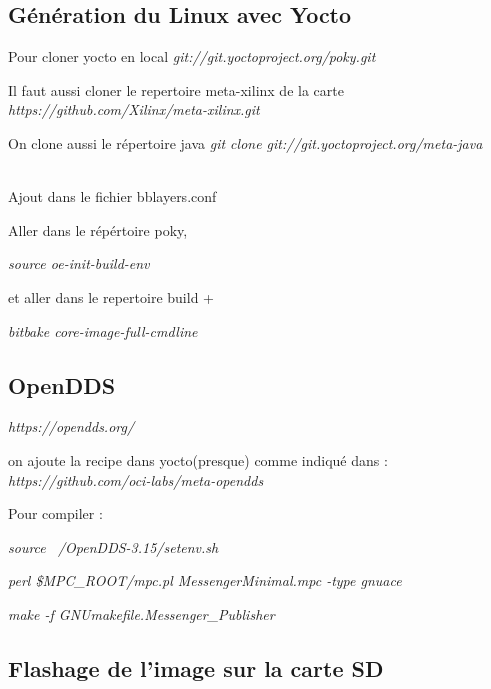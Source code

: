 \subsection{Génération du Linux avec Yocto}
Pour cloner yocto en local
\textit{git://git.yoctoproject.org/poky.git}

Il faut aussi cloner le repertoire meta-xilinx de la carte 
\textit{https://github.com/Xilinx/meta-xilinx.git}

On clone aussi le répertoire java
\textit{git clone git://git.yoctoproject.org/meta-java}

\\

Ajout dans le fichier bblayers.conf
\\



Aller dans le répértoire poky, 

\textit{ source oe-init-build-env}

et aller dans le repertoire build +

\textit{ bitbake core-image-full-cmdline} 
\subsection{OpenDDS}

\textit{https://opendds.org/}

on ajoute la recipe dans yocto(presque) comme indiqué dans :
\textit{https://github.com/oci-labs/meta-opendds}


Pour compiler : 

\textit{
source ~/OpenDDS-3.15/setenv.sh} 

\textit{
perl \$MPC\_ROOT/mpc.pl MessengerMinimal.mpc -type gnuace}

\textit{
make -f GNUmakefile.Messenger_Publisher}


\subsection{Flashage de l’image sur la carte SD}

